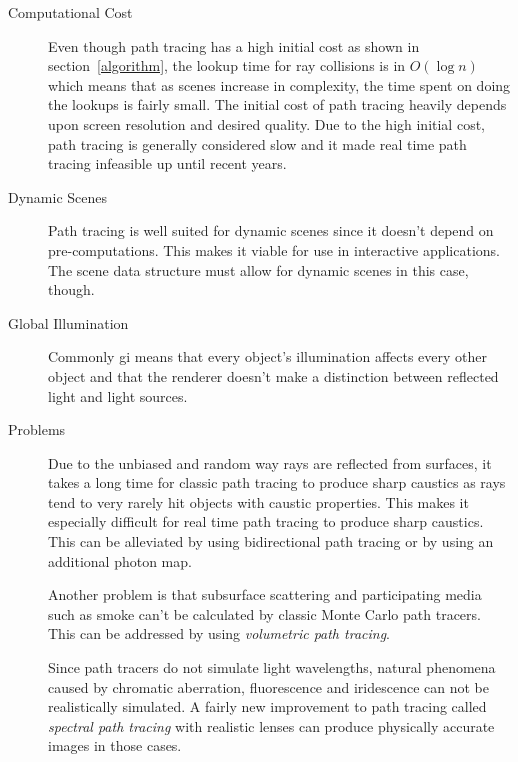 \documentclass[
  twoside,
  11pt, a4paper,
  footinclude=true,
  headinclude=true,
  cleardoublepage=empty
]{scrreprt}
\begin{document}
\begin{description}
    \item[Computational Cost]
        Even though path tracing has a high initial cost as shown in section~\ref{algorithm}, the lookup time for ray collisions is in
        \(O(\log n)\) which means that as scenes increase in complexity, the time spent on doing the
        lookups is fairly small. The initial cost of path tracing heavily depends upon screen resolution
        and desired quality. Due to the high initial cost, path tracing is generally considered slow and
        it made real time path tracing infeasible up until recent years.

    \item[Dynamic Scenes]
        Path tracing is well suited for dynamic scenes since it doesn't depend on pre-computations. This
        makes it viable for use in interactive applications. The scene data structure must allow for
        dynamic scenes in this case, though.

    \item[Global Illumination]
        Commonly \acf{gi} means that every object's illumination affects every other object and that the
        renderer doesn't make a distinction between reflected light and light sources.

    \item[Problems]
        Due to the unbiased and random way rays are reflected from surfaces, it takes a long time for
        classic path tracing to
        produce sharp caustics as rays tend to very rarely hit objects with caustic properties. This makes
        it especially difficult for real time path tracing to produce sharp caustics. This can be
        alleviated by using bidirectional path tracing or by using an additional photon map.

        Another problem is that subsurface scattering and participating media such as smoke can't be
        calculated by classic Monte Carlo path
        tracers. This can be addressed by using \emph{volumetric path tracing}.
        \cite{wiki:volumetric-path-tracing} \cite{incollection:volumetric-path-tracing}

        Since path tracers do not simulate light wavelengths, natural phenomena caused by chromatic
        aberration, fluorescence and iridescence can not be realistically simulated. A fairly new
        improvement to path tracing called \emph{spectral path tracing} with realistic lenses can produce
        physically accurate images in those cases. \cite{inproceedings:realistic-lenses} \cite{site:lambda}
        \cite{site:luculentus} \cite{site:robigo-luculenta}
\end{description}
\end{document}
